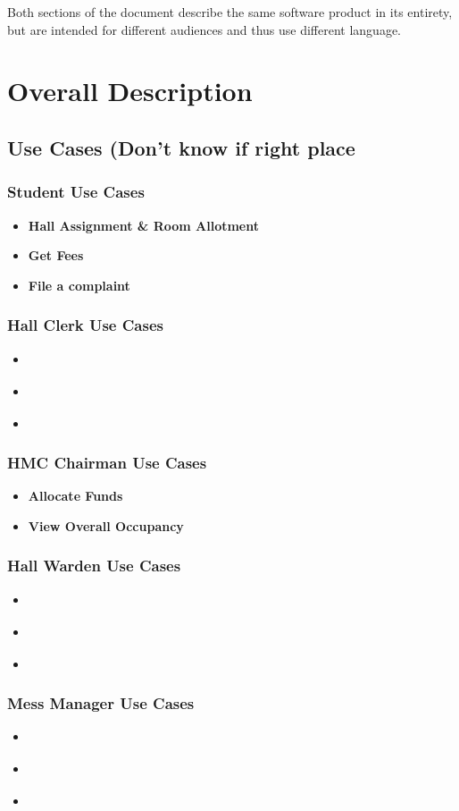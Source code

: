 \documentclass[letterpaper,12pt]{article}
\begin{document}
Both sections of the document describe the same software product in its entirety,
but are intended for different audiences and thus use different language.
\section{\LARGE Overall Description}
\subsection{\Large Use Cases (Don't know if right place}
\subsubsection{Student Use Cases}
\begin{itemize}
    \item \textbf{Hall Assignment & Room Allotment}
    \item \textbf{Get Fees}
    \item \textbf{File a complaint}
\end{itemize}
\subsubsection{Hall Clerk Use Cases}
\begin{itemize}
    \item \textbf{}
    \item \textbf{}
    \item \textbf{}
\end{itemize}
\subsubsection{HMC Chairman Use Cases}
\begin{itemize}
    \item \textbf{Allocate Funds}
    \item \textbf{View Overall Occupancy}
\end{itemize}
\subsubsection{Hall Warden Use Cases}
\begin{itemize}
    \item \textbf{}
    \item \textbf{}
    \item \textbf{}
\end{itemize}
\subsubsection{Mess Manager Use Cases}
\begin{itemize}
    \item \textbf{}
    \item \textbf{}
    \item \textbf{}
\end{itemize}
\end{document}
